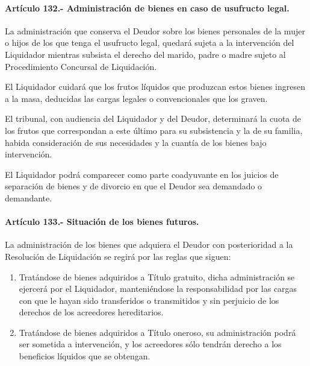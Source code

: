 \documentclass[
]{book}
\begin{document}
\hypertarget{artuxedculo-132.--administraciuxf3n-de-bienes-en-caso-de-usufructo-legal.}{%
\paragraph*{Artículo 132.- Administración de bienes en caso de usufructo legal.}\label{artuxedculo-132.--administraciuxf3n-de-bienes-en-caso-de-usufructo-legal.}}

La administración que conserva el Deudor sobre los bienes personales de la mujer o hijos de los que tenga el usufructo legal, quedará sujeta a la intervención del Liquidador mientras subsista el derecho del marido, padre o madre sujeto al Procedimiento Concursal de Liquidación.

El Liquidador cuidará que los frutos líquidos que produzcan estos bienes ingresen a la masa, deducidas las cargas legales o convencionales que los graven.

El tribunal, con audiencia del Liquidador y del Deudor, determinará la cuota de los frutos que correspondan a este último para su subsistencia y la de su familia, habida consideración de sus necesidades y la cuantía de los bienes bajo intervención.

El Liquidador podrá comparecer como parte coadyuvante en los juicios de separación de bienes y de divorcio en que el Deudor sea demandado o demandante.

\hypertarget{artuxedculo-133.--situaciuxf3n-de-los-bienes-futuros.}{%
\paragraph*{Artículo 133.- Situación de los bienes futuros.}\label{artuxedculo-133.--situaciuxf3n-de-los-bienes-futuros.}}

La administración de los bienes que adquiera el Deudor con posterioridad a la Resolución de Liquidación se regirá por las reglas que siguen:

\begin{enumerate}
\def\labelenumi{\alph{enumi})}
\item
  Tratándose de bienes adquiridos a Título gratuito, dicha administración se ejercerá por el Liquidador, manteniéndose la responsabilidad por las cargas con que le hayan sido transferidos o transmitidos y sin perjuicio de los derechos de los acreedores hereditarios.
\item
  Tratándose de bienes adquiridos a Título oneroso, su administración podrá ser sometida a intervención, y los acreedores sólo tendrán derecho a los beneficios líquidos que se obtengan.
\end{enumerate}
\end{document}
